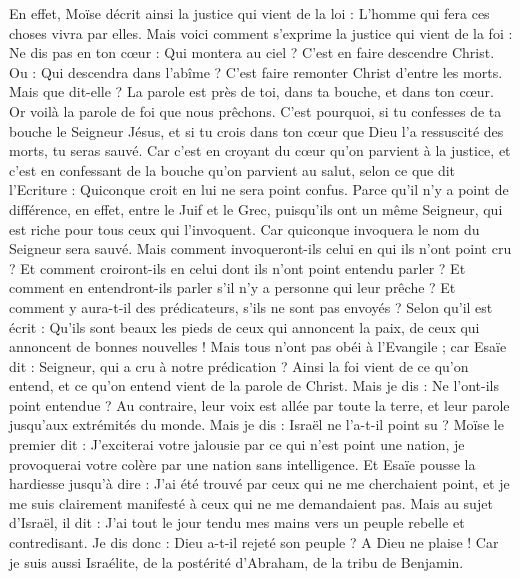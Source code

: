 \begin{multicols}{2}
En effet, Moïse décrit ainsi la justice qui vient de la loi : L'homme qui fera ces choses vivra par elles.
Mais voici comment s'exprime la justice qui vient de la foi : Ne dis pas en ton cœur : Qui montera au ciel ? C’est en faire descendre Christ.
Ou : Qui descendra dans l'abîme ? C’est faire remonter Christ d’entre les morts.
Mais que dit-elle ? La parole est près de toi, dans ta bouche, et dans ton cœur. Or voilà la parole de foi que nous prêchons.
C'est pourquoi, si tu confesses de ta bouche le Seigneur Jésus, et si tu crois dans ton cœur que Dieu l'a ressuscité des morts, tu seras sauvé.
Car c’est en croyant du cœur qu’on parvient à la justice, et c’est en confessant de la bouche qu’on parvient au salut, selon ce que dit l’Ecriture :
Quiconque croit en lui ne sera point confus.
Parce qu'il n'y a point de différence, en effet, entre le Juif et le Grec, puisqu’ils ont un même Seigneur, qui est riche pour tous ceux qui l'invoquent.
Car quiconque invoquera le nom du Seigneur sera sauvé.
Mais comment invoqueront-ils celui en qui ils n'ont point cru ? Et comment croiront-ils en celui dont ils n'ont point entendu parler ? Et comment en entendront-ils parler s'il n'y a personne qui leur prêche ?
Et comment y aura-t-il des prédicateurs, s’ils ne sont pas envoyés ? Selon qu'il est écrit : Qu’ils sont beaux les pieds de ceux qui annoncent la paix, de ceux qui annoncent de bonnes nouvelles !
Mais tous n'ont pas obéi à l'Evangile ; car Esaïe dit : Seigneur, qui a cru à notre prédication ?
Ainsi la foi vient de ce qu’on entend, et ce qu’on entend vient de la parole de Christ.
Mais je dis : Ne l'ont-ils point entendue ? Au contraire, leur voix est allée par toute la terre, et leur parole jusqu’aux extrémités du monde.
Mais je dis : Israël ne l'a-t-il point su ? Moïse le premier dit : J’exciterai votre jalousie par ce qui n'est point une nation, je provoquerai votre colère par une nation sans intelligence.
Et Esaïe pousse la hardiesse jusqu’à dire : J'ai été trouvé par ceux qui ne me cherchaient point, et je me suis clairement manifesté à ceux qui ne me demandaient pas.
Mais au sujet d’Israël, il dit : J'ai tout le jour tendu mes mains vers un peuple rebelle et contredisant.
\VerseOne{}Je dis donc : Dieu a-t-il rejeté son peuple ? A Dieu ne plaise ! Car je suis aussi Israélite, de la postérité d'Abraham, de la tribu de Benjamin.

\end{multicols}
